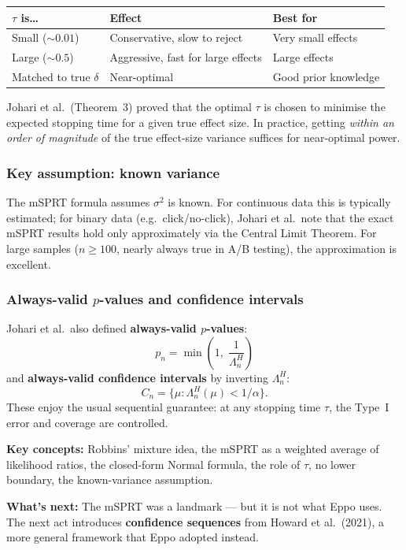 \documentclass[12pt, a4paper]{article}
\newcommand{\LR}{\Lambda}              %
\begin{document}
\begin{center}
\begin{tabular}{@{} l l l @{}}
\toprule
$\tau$ is\ldots & \textbf{Effect} & \textbf{Best for} \\
\midrule
Small ($\sim\!0.01$) & Conservative, slow to reject & Very small effects \\
Large ($\sim\!0.5$)  & Aggressive, fast for large effects & Large effects \\
Matched to true $\delta$ & Near-optimal & Good prior knowledge \\
\bottomrule
\end{tabular}
\end{center}

Johari et al.\ (Theorem~3) proved that the optimal $\tau$ is chosen to
minimise the expected stopping time for a given true effect size.  In practice,
getting \emph{within an order of magnitude} of the true effect-size variance
suffices for near-optimal power.

\subsubsection*{Key assumption: known variance}

The mSPRT formula assumes $\sigma^2$ is known.  For continuous data this is
typically estimated; for binary data (e.g.\ click/no-click), Johari et al.\
note that the exact mSPRT results hold only approximately via the Central Limit
Theorem.  For large samples ($n \geq 100$, nearly always
true in A/B testing), the approximation is excellent.

\subsubsection*{Always-valid $p$-values and confidence intervals}

Johari et al.\ also defined \textbf{always-valid $p$-values}:
\[
  p_n = \min\!\left(1,\; \frac{1}{\LR_n^{H}}\right)
\]
and \textbf{always-valid confidence intervals} by inverting $\LR_n^H$:
\[
  C_n = \bigl\{\mu : \LR_n^{H}(\mu) < 1/\alpha \bigr\}.
\]
These enjoy the usual sequential guarantee: at any stopping time $\tau$,
the Type~I error and coverage are controlled.

\begin{keytakeaway}
\textbf{Key concepts:} Robbins' mixture idea, the mSPRT as a weighted average
of likelihood ratios, the closed-form Normal formula, the role of $\tau$,
no lower boundary, the known-variance assumption.

\textbf{What's next:}  The mSPRT was a landmark --- but it is not what Eppo
uses.  The next act introduces \textbf{confidence sequences} from
Howard et al.\ (2021), a more general framework that Eppo adopted instead.
\end{keytakeaway}
\end{document}
